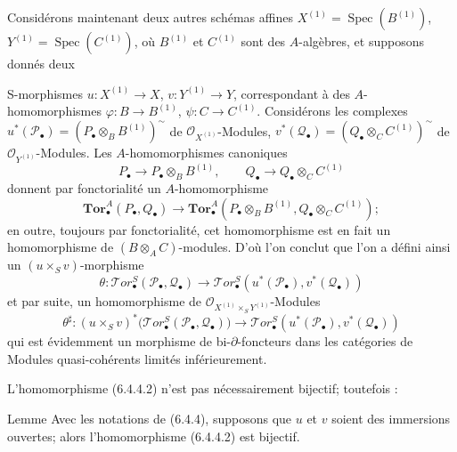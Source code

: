 \begin{env}[6.4.4]
Considérons maintenant deux autres schémas affines
$X^{(1)}=\operatorname{Spec}(B^{(1)})$,
$Y^{(1)}=\operatorname{Spec}(C^{(1)})$, où $B^{(1)}$ et $C^{(1)}$ sont des
$A$-algèbres, et supposons donnés deux

S-morphismes $u:X^{(1)}\to X$, $v:Y^{(1)}\to Y$, correspondant à des
$A$-homomorphismes $\varphi:B\to B^{(1)}$, $\psi:C\to C^{(1)}$.
Considérons les complexes
$u^*(\mathscr P_\bullet)=(P_\bullet\otimes_B B^{(1)})^{\sim}$ de
$\mathscr O_{X^{(1)}}$-Modules,
$v^*(\mathscr Q_\bullet)=(Q_\bullet\otimes_C C^{(1)})^{\sim}$ de
$\mathscr O_{Y^{(1)}}$-Modules. Les $A$-homomorphismes canoniques
\[
  P_\bullet\longrightarrow P_\bullet\otimes_B B^{(1)},
  \qquad
  Q_\bullet\longrightarrow Q_\bullet\otimes_C C^{(1)}
\]
donnent par fonctorialité un $A$-homomorphisme
\[
  \mathbf{Tor}_\bullet^A(P_\bullet,Q_\bullet)
  \longrightarrow
  \mathbf{Tor}_\bullet^A
  (P_\bullet\otimes_B B^{(1)},Q_\bullet\otimes_C C^{(1)});
\]
en outre, toujours par fonctorialité, cet homomorphisme est en fait un
homomorphisme de $(B\otimes_A C)$-modules. D'où l'on conclut que l'on a défini
ainsi un $(u\times_S v)$-morphisme
\[
  \theta:\mathscr{T}\!or_\bullet^S(\mathscr P_\bullet,\mathscr Q_\bullet)
  \longrightarrow
  \mathscr{T}\!or_\bullet^S
  (u^*(\mathscr P_\bullet),v^*(\mathscr Q_\bullet))
  \tag{6.4.4.1}\label{III.6.4.4.1.fr}
\]
et par suite, un homomorphisme de
$\mathscr O_{X^{(1)}\times_S Y^{(1)}}$-Modules
\[
  \theta^\sharp:(u\times_S v)^*
  \bigl(\mathscr{T}\!or_\bullet^S(\mathscr P_\bullet,\mathscr Q_\bullet)\bigr)
  \longrightarrow
  \mathscr{T}\!or_\bullet^S
  (u^*(\mathscr P_\bullet),v^*(\mathscr Q_\bullet))
  \tag{6.4.4.2}\label{III.6.4.4.2.fr}
\]
qui est évidemment un morphisme de bi-$\partial$-foncteurs dans les catégories
de Modules quasi-cohérents limités inférieurement.

L'homomorphisme (6.4.4.2) n'est pas nécessairement bijectif; toutefois :
\end{env}

\begin{namedtheorem}[6.4.5]{Lemme}
Avec les notations de (6.4.4), supposons que $u$ et $v$ soient des immersions
ouvertes; alors l'homomorphisme (6.4.4.2) est bijectif.
\end{namedtheorem}

